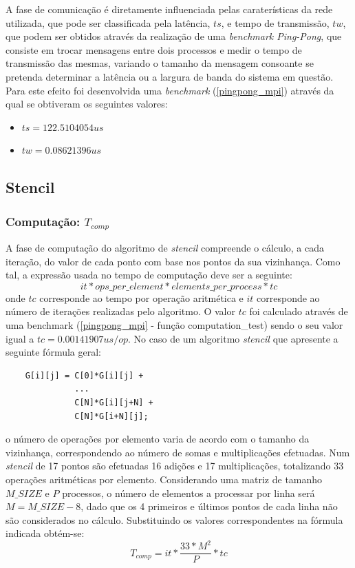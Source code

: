 \documentclass{article}
\begin{document}
A fase de comunicação é diretamente influenciada pelas caraterísticas da rede utilizada, que pode ser classificada pela
latência, $ts$, e tempo de transmissão, $tw$, que podem ser obtidos através da realização de uma \textit{benchmark Ping-Pong}, 
que consiste em trocar mensagens entre dois processos e medir o tempo de transmissão das mesmas, variando o tamanho da mensagem 
consoante se pretenda determinar a latência ou a largura de banda do sistema em questão. Para este efeito foi desenvolvida 
uma \textit{benchmark} (\ref{pingpong_mpi}) através da qual se obtiveram os seguintes valores:
\begin{itemize}
    \item $ts=122.5104054 us$
    \item $tw=0.08621396 us$
\end{itemize}

\subsection{Stencil} \label{teoStencil}

\subsubsection{Computação: $T_{comp}$}
A fase de computação do algoritmo de \textit{stencil} compreende o cálculo, a cada
iteração, do valor de cada ponto com base nos pontos da sua vizinhança. Como tal, a 
expressão usada no tempo de computação deve ser a seguinte:
$$it * ops\_per\_element * elements\_per\_process * tc$$
onde $tc$ corresponde ao tempo por operação aritmética e $it$ corresponde ao número
de iterações realizadas pelo algoritmo. O valor $tc$ foi calculado através de uma benchmark 
(\ref{pingpong_mpi} - função computation\_test) sendo o seu valor igual a $tc=0.00141907 us/op$. 
No caso de um algoritmo \textit{stencil} que apresente a seguinte fórmula geral:
\begin{verbatim}
    G[i][j] = C[0]*G[i][j] + 
              ... 
              C[N]*G[i][j+N] + 
              C[N]*G[i+N][j];
\end{verbatim}
o número de operações por elemento varia de acordo com o tamanho da vizinhança, 
correspondendo ao número de somas e multiplicações efetuadas. Num \textit{stencil} 
de 17 pontos são efetuadas 16 adições e 17 multiplicações, totalizando 33 operações 
aritméticas por elemento. Considerando uma matriz de tamanho $M\_SIZE$ e $P$ processos, 
o número de elementos a processar por linha será $M=M\_SIZE-8$, dado que os 4 primeiros 
e últimos pontos de cada linha não são considerados no cálculo. Substituindo os valores 
correspondentes na fórmula indicada obtém-se:
$$T_{comp} = it*\frac{33*M^2}{P}*tc$$
\end{document}
